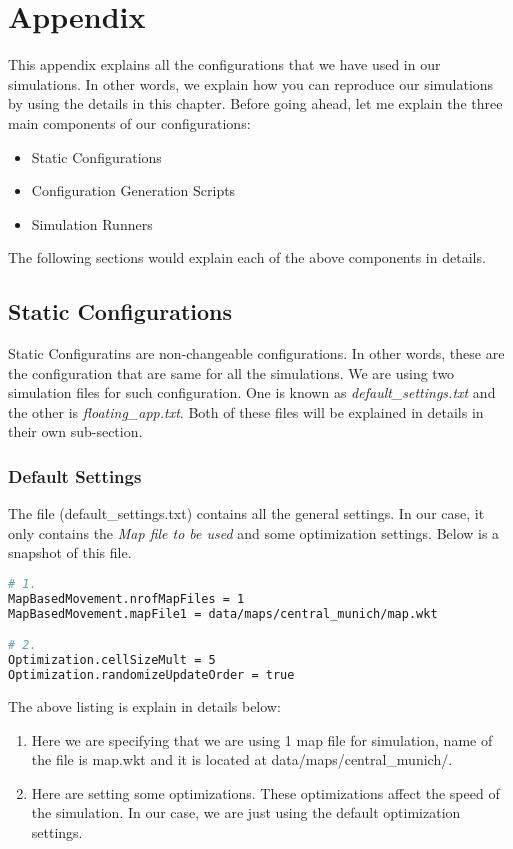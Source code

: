 
\chapter{Appendix}\label{chapter:appendix}
This appendix explains all the configurations that we have used in our simulations. In other words, we explain how you can reproduce our simulations by using the details in this chapter. Before going ahead, let me explain the three main components of our configurations:

\begin{itemize}
  \item Static Configurations
  \item Configuration Generation Scripts
  \item Simulation Runners
\end{itemize}

The following sections would explain each of the above components in details.

\section{Static Configurations}
Static Configuratins are non-changeable configurations. In other words, these are the configuration that are same for all the simulations. We are using two simulation files for such configuration. One is known as \textit{default\_settings.txt} and the other is \textit{floating\_app.txt}. Both of these files will be explained in details in their own sub-section.

\subsection{Default Settings}
The file (default\_settings.txt) contains all the general settings. In our case, it only contains the \textit{Map file to be used} and some optimization settings. Below is a snapshot of this file.

\begin{lstlisting}[language=bash]
# 1.
MapBasedMovement.nrofMapFiles = 1
MapBasedMovement.mapFile1 = data/maps/central_munich/map.wkt

# 2.
Optimization.cellSizeMult = 5
Optimization.randomizeUpdateOrder = true
\end{lstlisting}
\vspace{4mm}
The above listing is explain in details below:
\begin{enumerate}
  \item Here we are specifying that we are using 1 map file for simulation, name of the file is map.wkt and it is located at data/maps/central\_munich/.
  \item Here are setting some optimizations. These optimizations affect the speed of the simulation. In our case, we are just using the default optimization settings.
\end{enumerate}

